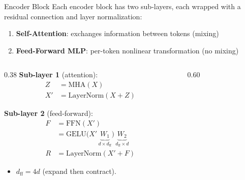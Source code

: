 \begin{frame}{Encoder Block}
  Each encoder block has two sub-layers, each wrapped with a residual connection and layer normalization:
  \begin{enumerate}
    \item \textbf{Self-Attention}: exchanges information between tokens (mixing)
    \item \textbf{Feed-Forward MLP}: per-token nonlinear transformation (no mixing)
  \end{enumerate}

  \begin{columns}[T]
    \begin{column}{0.38\textwidth}
      \vspace{0.8em}
      \textbf{Sub-layer 1} (attention):
      \begin{align*}
        Z &= \mathrm{MHA}(X) \\
        X' &= \mathrm{LayerNorm}(X + Z)
      \end{align*}

      \vspace{0.3em}
      \textbf{Sub-layer 2} (feed-forward):
      \begin{align*}
        F &= \mathrm{FFN}(X') \\
          &= \mathrm{GELU}\!\bigl(X'\, \underbrace{W_1}_{d \times d_{\mathrm{ff}}}\bigr)\, \underbrace{W_2}_{d_{\mathrm{ff}} \times d} \\
        R &= \mathrm{LayerNorm}(X' + F)
      \end{align*}

      \begin{itemize}
        \item {\small $d_{\mathrm{ff}} = 4d$ (expand then contract).}
      \end{itemize}
    \end{column}
    \begin{column}{0.60\textwidth}
      \begin{center}
\end{center}
\end{column}
\end{columns}
\end{frame}

